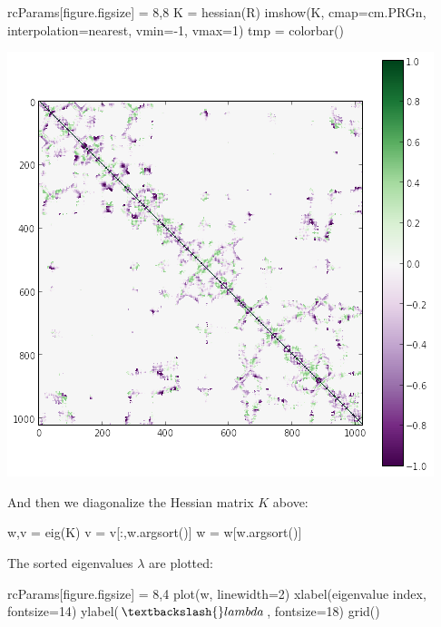 \documentclass[
]{article}
\newenvironment{Shaded}{}{}
\newcommand{\DecValTok}[1]{\textcolor[rgb]{0.25,0.63,0.44}{#1}}
\newcommand{\NormalTok}[1]{#1}
\newcommand{\OperatorTok}[1]{\textcolor[rgb]{0.40,0.40,0.40}{#1}}
\newcommand{\StringTok}[1]{\textcolor[rgb]{0.25,0.44,0.63}{#1}}
\begin{document}
\begin{Shaded}
\begin{Highlighting}[]
\NormalTok{rcParams[}\StringTok{\textquotesingle{}figure.figsize\textquotesingle{}}\NormalTok{] }\OperatorTok{=} \DecValTok{8}\NormalTok{,}\DecValTok{8}
\NormalTok{K }\OperatorTok{=}\NormalTok{ hessian(R)}
\NormalTok{imshow(K, cmap}\OperatorTok{=}\NormalTok{cm.PRGn, interpolation}\OperatorTok{=}\StringTok{\textquotesingle{}nearest\textquotesingle{}}\NormalTok{, vmin}\OperatorTok{={-}}\DecValTok{1}\NormalTok{, vmax}\OperatorTok{=}\DecValTok{1}\NormalTok{)}
\NormalTok{tmp }\OperatorTok{=}\NormalTok{ colorbar()}
\end{Highlighting}
\end{Shaded}

\includegraphics{figures/normal_modes_14_0.png}

And then we diagonalize the Hessian matrix \(K\) above:

\begin{Shaded}
\begin{Highlighting}[]
\NormalTok{w,v }\OperatorTok{=}\NormalTok{ eig(K)}
\NormalTok{v }\OperatorTok{=}\NormalTok{ v[:,w.argsort()]}
\NormalTok{w }\OperatorTok{=}\NormalTok{ w[w.argsort()]}
\end{Highlighting}
\end{Shaded}

The sorted eigenvalues \(\lambda\) are plotted:

\begin{Shaded}
\begin{Highlighting}[]
\NormalTok{rcParams[}\StringTok{\textquotesingle{}figure.figsize\textquotesingle{}}\NormalTok{] }\OperatorTok{=} \DecValTok{8}\NormalTok{,}\DecValTok{4}
\NormalTok{plot(w, linewidth}\OperatorTok{=}\DecValTok{2}\NormalTok{)}
\NormalTok{xlabel(}\StringTok{\textquotesingle{}eigenvalue index\textquotesingle{}}\NormalTok{, fontsize}\OperatorTok{=}\DecValTok{14}\NormalTok{)}
\NormalTok{ylabel(}\StringTok{\textquotesingle{}$\textbackslash{}lambda$\textquotesingle{}}\NormalTok{, fontsize}\OperatorTok{=}\DecValTok{18}\NormalTok{)}
\NormalTok{grid()}
\end{Highlighting}
\end{Shaded}
\end{document}
